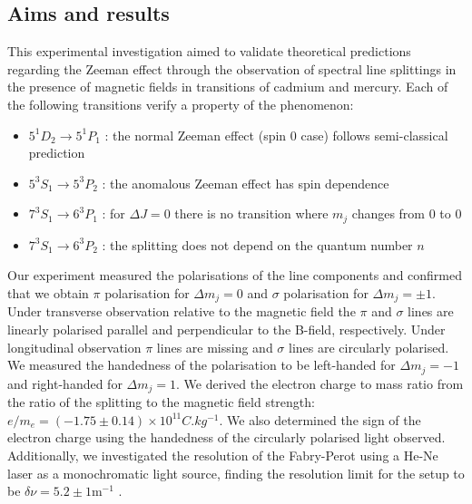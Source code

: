 \documentclass[11pt]{article}
\begin{document}
\subsection{Aims and results}
This experimental investigation aimed to validate theoretical predictions regarding the Zeeman effect through the observation of spectral line splittings in the presence of magnetic fields in transitions of cadmium and mercury. Each of the following transitions verify a property of the phenomenon: 
\begin{itemize}
    \item $5^1 D_2 \rightarrow 5^1 P_1$ : the normal Zeeman effect (spin 0 case) follows semi-classical prediction
    \item $5^3 S_1 \rightarrow 5^3 P_2$ : the anomalous Zeeman effect has spin dependence
    \item $7^3 S_1 \rightarrow 6^3 P_1$ : for $\Delta J = 0$ there is no transition where $m_j$ changes from 0 to 0
    \item $7^3 S_1 \rightarrow 6^3 P_2$ : the splitting does not depend on the quantum number $n$
\end{itemize}
Our experiment measured the polarisations of the line components and confirmed that we obtain $\pi$ polarisation for $\Delta m_j = 0$ and $\sigma$ polarisation for $\Delta m_j = \pm 1$. Under transverse observation relative to the magnetic field the $\pi$ and $\sigma$ lines are linearly polarised parallel and perpendicular to the B-field, respectively. Under longitudinal observation $\pi$ lines are missing and $\sigma$ lines are circularly polarised. We measured the handedness of the polarisation to be left-handed for $\Delta m_j = -1$ and right-handed for $\Delta m_j = 1$. 
We derived the electron charge to mass ratio from the ratio of the splitting to the magnetic field strength: $e/m_e = (-1.75 \pm 0.14) \times 10^{11} \si{C.kg^{-1}}$. We also determined the sign of the electron charge using the handedness of the circularly polarised light observed. Additionally, we investigated the resolution of the Fabry-Perot using a He-Ne laser as a monochromatic light source, finding the resolution limit for the setup to be $\delta \nu = 5.2 \pm 1 \mathrm{m}^{-1}$ . 




\newpage

\appendix
\end{document}

